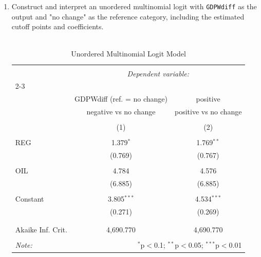 \documentclass[12pt,letterpaper]{article}
\begin{document}
\begin{enumerate}
	\item Construct and interpret an unordered multinomial logit with \texttt{GDPWdiff} as the output and "no change" as the reference category, including the estimated cutoff points and coefficients.
	\vspace{.25cm}\\\\
	 
	
	\begin{table}[!htbp] \centering 
		\caption{Unordered Multinomial Logit Model} 
		\label{} 
		\begin{tabular}{@{\extracolsep{5pt}}lcc} 
			\\[-1.8ex]\hline 
			\hline \\[-1.8ex] 
			& \multicolumn{2}{c}{\textit{Dependent variable:}} \\ 
			\cline{2-3} 
			\\[-1.8ex] & GDPWdiff (ref. = no change) & positive \\ 
			& negative vs no change & positive vs no change \\ 
			\\[-1.8ex] & (1) & (2)\\ 
			\hline \\[-1.8ex] 
			REG & 1.379$^{*}$ & 1.769$^{**}$ \\ 
			& (0.769) & (0.767) \\ 
			& & \\ 
			OIL & 4.784 & 4.576 \\ 
			& (6.885) & (6.885) \\ 
			& & \\ 
			Constant & 3.805$^{***}$ & 4.534$^{***}$ \\ 
			& (0.271) & (0.269) \\ 
			& & \\ 
			\hline \\[-1.8ex] 
			Akaike Inf. Crit. & 4,690.770 & 4,690.770 \\ 
			\hline 
			\hline \\[-1.8ex] 
			\textit{Note:}  & \multicolumn{2}{r}{$^{*}$p$<$0.1; $^{**}$p$<$0.05; $^{***}$p$<$0.01} \\ 
		\end{tabular} 
	\end{table} 
	
	\vspace{.25cm}
	

\end{enumerate}
\end{document}
